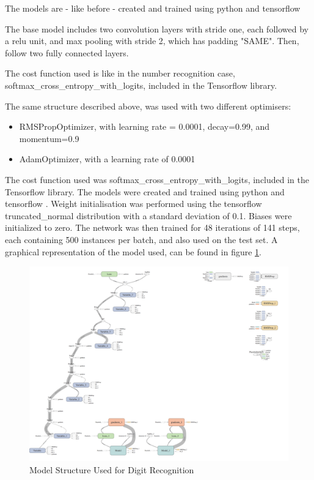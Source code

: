\documentclass[final,12p,times]{elsarticle}
\begin{document}
The models are - like before - created and trained using python \cite{python} and tensorflow \cite{45166}

The base model includes two convolution layers with stride one, each followed by a relu unit, and max pooling with stride 2, 
which has padding "SAME".
Then, follow two fully connected layers.


The cost function used is like in the number recognition case,  softmax\_cross\_entropy\_with\_logits, included in the 
Tensorflow library.


The same structure described above, was used with two different optimisers:
\begin{itemize}
\item RMSPropOptimizer, with learning rate = 0.0001, decay=0.99, and momentum=0.9 
\item AdamOptimizer, with a learning rate of 0.0001
\end{itemize}

The cost function used was softmax\_cross\_entropy\_with\_logits, included in the Tensorflow library.
The models were created and trained using python \cite{python} and tensorflow \cite{45166}.
Weight initialisation was performed using the tensorflow truncated\_normal distribution with a standard deviation of 0.1.
Biases were initialized to zero.
The network was then trained for 48 iterations of 141 steps, each containing 500 instances per batch, and also used on the test set.
A graphical representation of the model used, can be found in 
figure \ref{fig:Fig4.3}.

\begin{figure}[H]
  \includegraphics[width=1.2\textwidth, center]{reviewer_net.png}
  \caption{Model Structure Used for Digit Recognition}
  \label{fig:Fig4.3}
  \end{figure}
  
\end{document}

